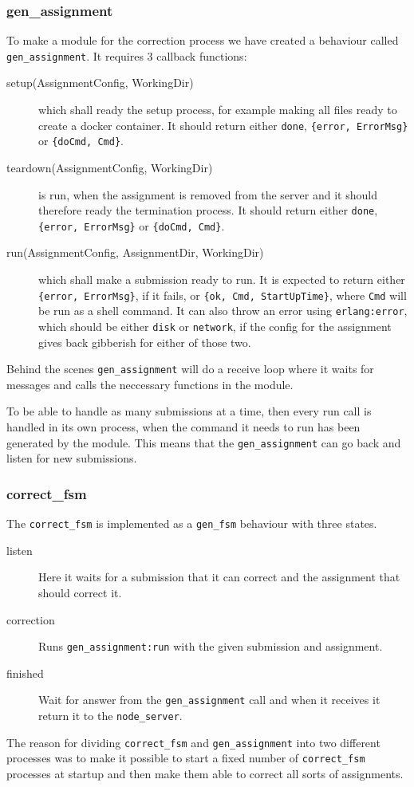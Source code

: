 \subsubsection{gen\_assignment}
To make a module for the correction process we have created a behaviour called
\texttt{gen\_assignment}. It requires 3 callback functions:
\begin{description}
    \item[setup(AssignmentConfig, WorkingDir)] which shall ready the setup
    process, for example making all files ready to create a docker container.
    It should return either \texttt{done}, \texttt{\{error, ErrorMsg\}} or
    \texttt{\{doCmd, Cmd\}}.
    \item[teardown(AssignmentConfig, WorkingDir)] is run, when the assignment is
    removed from the server and it should therefore ready the termination
    process. It should return either \texttt{done}, \texttt{\{error, ErrorMsg\}}
    or \texttt{\{doCmd, Cmd\}}.
    \item[run(AssignmentConfig, AssignmentDir, WorkingDir)] which shall make a
    submission ready to run. It is expected to return either
    \texttt{\{error, ErrorMsg\}}, if it fails, or
    \texttt{\{ok, Cmd, StartUpTime\}}, where \texttt{Cmd} will be run as a shell
    command. It can also throw an error using \texttt{erlang:error}, which
    should be either \texttt{disk} or \texttt{network}, if the config for the
    assignment gives back gibberish for either of those two.
\end{description}

Behind the scenes \texttt{gen\_assignment} will do a receive loop where it waits
for messages and calls the neccessary functions in the module.

To be able to handle as many submissions at a time, then every run call is
handled in its own process, when the command it needs to run has been generated
by the module. This means that the \texttt{gen\_assignment} can go back and
listen for new submissions.

\subsubsection{correct\_fsm}
The \texttt{correct\_fsm} is implemented as a \texttt{gen\_fsm} behaviour with
three states.
\begin{description}
    \item[listen] Here it waits for a submission that it can correct and the
    assignment that should correct it.
    \item[correction] Runs \texttt{gen\_assignment:run} with the given
    submission and assignment.
    \item[finished] Wait for answer from the \texttt{gen\_assignment} call and
    when it receives it return it to the \texttt{node\_server}.
\end{description}

The reason for dividing \texttt{correct\_fsm} and \texttt{gen\_assignment} into
two different processes was to make it possible to start a fixed number of
\texttt{correct\_fsm} processes at startup and then make them able to correct
all sorts of assignments.

